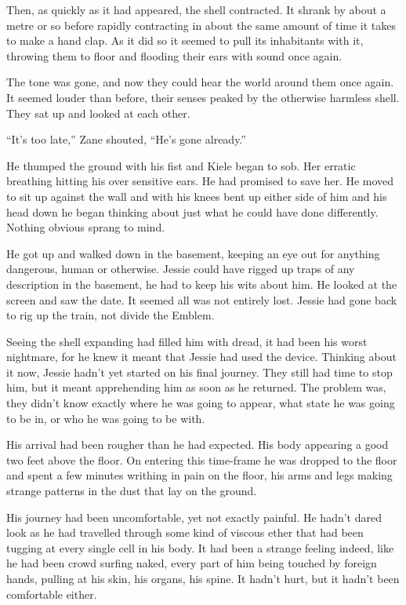 Then, as quickly as it had appeared, the shell contracted.  It shrank by about a metre or so before rapidly contracting in about the same amount of time it takes to make a hand clap.  As it did so it seemed to pull its inhabitants with it, throwing them to floor and flooding their ears with sound once again.

The tone was gone, and now they could hear the world around them once again.  It seemed louder than before, their senses peaked by the otherwise harmless shell.  They sat up and looked at each other.  

``It's too late,'' Zane shouted, ``He's gone already.''

He thumped the ground with his fist and Kiele began to sob.  Her erratic breathing hitting his over sensitive ears.  He had promised to save her.  He moved to sit up against the wall and with his knees bent up either side of him and his head down he began thinking about just what he could have done differently.  Nothing obvious sprang to mind.  

He got up and walked down in the basement, keeping an eye out for anything dangerous, human or otherwise.  Jessie could have rigged up traps of any description in the basement, he had to keep his wits about him.  He looked at the screen and saw the date.  It seemed all was not entirely lost.  Jessie had gone back to rig up the train, not divide the Emblem.  

Seeing the shell expanding had filled him with dread, it had been his worst nightmare, for he knew it meant that Jessie had used the device.  Thinking about it now, Jessie hadn't yet started on his final journey.  They still had time to stop him, but it meant apprehending him as soon as he returned.  The problem was, they didn't know exactly where he was going to appear, what state he was going to be in, or who he was going to be with.



\thoughtbreak



His arrival had been rougher than he had expected.  His body appearing a good two feet above the floor.  On entering this time-frame he was dropped to the floor and spent a few minutes writhing in pain on the floor, his arms and legs making strange patterns in the dust that lay on the ground.

His journey had been uncomfortable, yet not exactly painful.  He hadn't dared look as he had travelled through some kind of viscous ether that had been tugging at every single cell in his body.  It had been a strange feeling indeed, like he had been crowd surfing naked, every part of him being touched by foreign hands, pulling at his skin, his organs, his spine.  It hadn't hurt, but it hadn't been comfortable either.  

